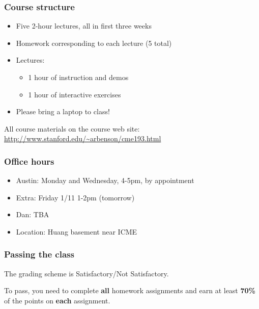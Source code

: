 \documentclass{beamer}
\begin{document}
\begin{frame}
\frametitle{Course structure}

\begin{itemize}
\setlength{\itemsep}{0.2in}
\item{
Five 2-hour lectures, all in first three weeks
}

\item{
Homework corresponding to each lecture (5 total)
}

\item{
Lectures:
\begin{itemize}
\setlength{\itemsep}{0.05in}
\item{1 hour of instruction and demos}
\item{1 hour of interactive exercises}
\end{itemize}
}

\item{
Please bring a laptop to class!
}
\end{itemize}

\vspace{0.2in}

All course materials on the course web site: \url{http://www.stanford.edu/~arbenson/cme193.html}

\end{frame}

\begin{frame}
\frametitle{Office hours}

\begin{itemize}
\setlength{\itemsep}{0.2in}
\item{Austin: Monday and Wednesday, 4-5pm, by appointment}
\item{Extra: Friday 1/11 1-2pm (tomorrow)}
\item{Dan: TBA}
\item{Location: Huang basement near ICME}
\end{itemize}

\end{frame}


\begin{frame}
\frametitle{Passing the class}

The grading scheme is Satisfactory/Not Satisfactory.

\vspace{0.2in}

To pass, you need to complete \textbf{all} homework assignments and earn at least \textbf{70\%} of the points on \textbf{each} assignment.

\end{frame}
\end{document}
